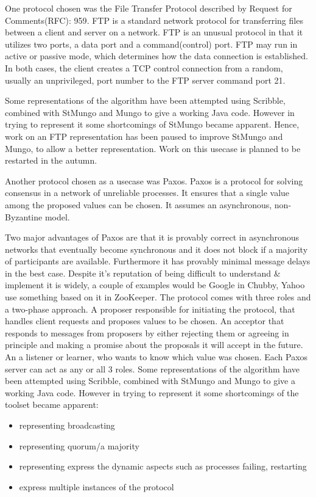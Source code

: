 One protocol chosen was the File Transfer Protocol described by Request for Comments(RFC): 959\cite{FTP-rfc}. FTP is a standard network protocol for transferring  files between a client and server on a network.  FTP is an unusual protocol in that it utilizes two ports, a data port and a command(control) port. FTP may run in active or passive mode, which determines how the data connection is established. In both cases, the client creates a TCP control connection from a random, usually an unprivileged, port number to the FTP server command port 21.

Some representations of the algorithm have been attempted using Scribble, combined with StMungo and Mungo to give a working Java code. However in trying to represent it some shortcomings of StMungo became apparent. Hence, work on an FTP representation has been paused to improve StMungo and Mungo, to allow a better representation. Work on this usecase is planned to be restarted in the autumn.


Another protocol chosen as a usecase was Paxos. Paxos is a protocol for solving consensus in a network of unreliable processes. It ensures that a single value among the proposed values can be chosen. It assumes an asynchronous, non-Byzantine model.\cite{lamport1998part}

Two major advantages of Paxos are that it is provably correct in asynchronous networks that eventually become synchronous and it does not block if a majority of participants are available. Furthermore it has provably minimal message delays in the best case. Despite it's reputation of being difficult to understand \& implement it is widely, a couple of examples would be Google in Chubby\cite{chandra2007paxos}, Yahoo use something based on it in ZooKeeper.
The protocol comes with three roles and a two-phase approach. A proposer
responsible for initiating the protocol, that handles client requests and
proposes values to be chosen. An acceptor that responds to messages from proposers by either rejecting them or agreeing in principle and making a promise about the proposals it will accept in the future. An a listener or learner, who wants to know which value was chosen. Each Paxos server can act as any or all 3 roles.\cite{lamport2001paxos} Some representations of the algorithm have been attempted using Scribble, combined with StMungo and Mungo to give a working Java code. However in trying to represent it some shortcomings of the toolset became apparent:
\begin{itemize}
  \item representing broadcasting
  \item representing quorum/a majority
  \item representing express the dynamic aspects such as processes failing, restarting
  \item express multiple instances of the protocol
\end{itemize}

